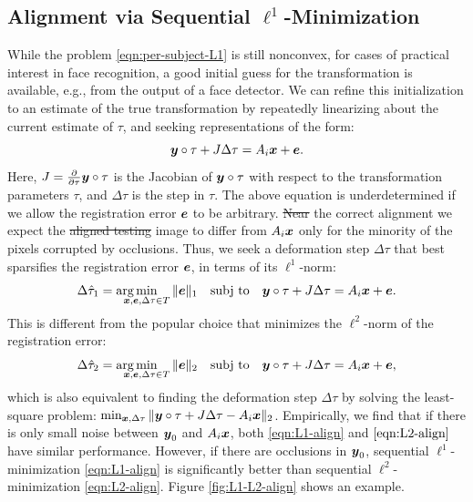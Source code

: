 \documentclass[12pt,journal,draftcls,letterpaper,onecolumn]{IEEEtran}
\newcommand{\subj}{\textup{subj to}}
\providecommand{\DIFadd}[1]{{\protect\color{blue}\uwave{#1}}} %
\providecommand{\DIFdel}[1]{{\protect\color{red}\sout{#1}}}                      %
\providecommand{\DIFaddbegin}{} %
\providecommand{\DIFaddend}{} %
\providecommand{\DIFdelbegin}{} %
\providecommand{\DIFdelend}{} %
\begin{document}
\subsection{Alignment via Sequential $\ell^1$-Minimization} While the problem \eqref{eqn:per-subject-L1} is still nonconvex, for cases of practical interest in face recognition, a good initial guess for the transformation is available, e.g., from the output of a face detector. We can refine this initialization to an estimate of the true transformation by repeatedly linearizing about  the current estimate of $\tau$, and seeking representations of the form:
\begin{equation}
{\boldsymbol{y}}\circ \tau + J \Delta \tau = A_i {\boldsymbol{x}} + \boldsymbol{e}.
\end{equation}
Here, $J = \frac{\partial}{\partial \tau} {\boldsymbol{y}} \circ \tau$ is the
Jacobian of ${\boldsymbol{y}} \circ \tau$ with respect to the transformation
parameters $\tau$, and $\Delta \tau$ is the step in $\tau$. The
above equation is underdetermined if we allow the registration
error $\boldsymbol{e}$ to be arbitrary. \DIFdelbegin \DIFdel{Near }\DIFdelend \DIFaddbegin \DIFadd{At }\DIFaddend the correct alignment we
expect the \DIFdelbegin \DIFdel{aligned testing }\DIFdelend \DIFaddbegin \DIFadd{test }\DIFaddend image to differ from $A_i {\boldsymbol{x}}$ only
for the minority of the pixels corrupted by occlusions. Thus,
we seek a deformation step $\Delta \tau$ that best sparsifies the registration error $\boldsymbol{e}$, in terms of its $\ell^1$-norm:
\begin{equation}
\Delta\hat{\tau}_1 = \arg\hspace{-3.5mm}\min_{\x,\e,\Delta\tau \in T} \| \e \|_1 \quad \subj \quad \y\circ\tau + J \Delta \tau = A_i \x + \e.
\label{eqn:L1-align}
\end{equation}
This is different from the popular choice that
minimizes the $\ell^2$-norm of the registration error:
\begin{equation}
\Delta\hat{\tau}_2 = \arg\hspace{-3.5mm}\min_{\x,\e,\Delta\tau \in T} \| \e \|_2 \quad \subj \quad \y\circ\tau + J \Delta \tau = A_i \x + \e,
\label{eqn:L2-align}
\end{equation}
which is also equivalent to finding the deformation step
$\Delta  \tau$ by solving the least-square problem:
$\min_{{\boldsymbol{x}},\Delta \tau} \|{\boldsymbol{y}} \circ \tau + J\Delta \tau - A_i {\boldsymbol{x}}
\|_2$. Empirically, we find that if there is only small noise
between ${\boldsymbol{y}}_0$ and $A_i{\boldsymbol{x}}$, both \eqref{eqn:L1-align} and
$\eqref{eqn:L2-align}$ have similar performance.  However, if
there are occlusions in ${\boldsymbol{y}}_0$, sequential
$\ell^1$-minimization \eqref{eqn:L1-align} is significantly
better than sequential $\ell^2$-minimization
\eqref{eqn:L2-align}. Figure \ref{fig:L1-L2-align} shows an
example.
\end{document}
